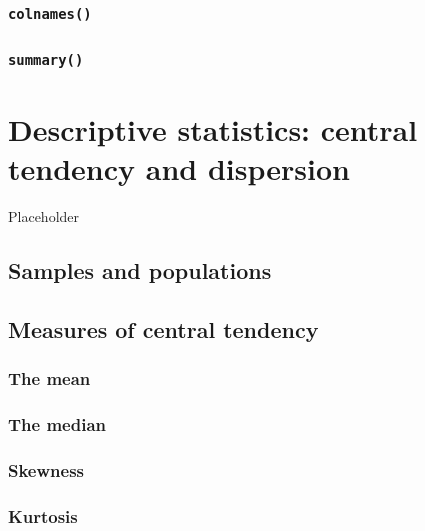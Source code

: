 \documentclass[english,10pt,a4paper,oneside]{book}
\begin{document}
\hypertarget{colnames}{%
\subsection{\texorpdfstring{\texttt{colnames()}}{colnames()}}\label{colnames}}

\hypertarget{summary}{%
\subsection{\texorpdfstring{\texttt{summary()}}{summary()}}\label{summary}}

\hypertarget{descriptive-statistics-central-tendency-and-dispersion}{%
\chapter{Descriptive statistics: central tendency and dispersion}\label{descriptive-statistics-central-tendency-and-dispersion}}

Placeholder

\hypertarget{samples-and-populations}{%
\section{Samples and populations}\label{samples-and-populations}}

\hypertarget{measures-of-central-tendency}{%
\section{Measures of central tendency}\label{measures-of-central-tendency}}

\hypertarget{the-mean}{%
\subsection{The mean}\label{the-mean}}

\hypertarget{the-median}{%
\subsection{The median}\label{the-median}}

\hypertarget{skewness}{%
\subsection{Skewness}\label{skewness}}

\hypertarget{kurtosis}{%
\subsection{Kurtosis}\label{kurtosis}}
\end{document}
